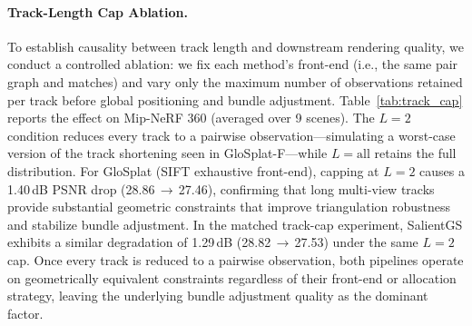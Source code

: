 \documentclass[sigconf]{acmart}
\begin{document}
\begin{table}[h]
\centering
\caption{Track-length distribution on the \texttt{bicycle} scene for GloSplat-A (SIFT exhaustive), GloSplat-F (XFeat+LightGlue, retrieval top-5), and SalientGS (Fisher Vector, $k{=}20$).}
\label{tab:track_dist}
\end{table}

\paragraph{Track-Length Cap Ablation.}
To establish causality between track length and downstream rendering quality, we conduct a controlled ablation: we fix each method's front-end (i.e., the same pair graph and matches) and vary only the maximum number of observations retained per track before global positioning and bundle adjustment. Table~\ref{tab:track_cap} reports the effect on Mip-NeRF 360 (averaged over 9 scenes).
The $L{=}2$ condition reduces every track to a pairwise observation---simulating a worst-case version of the track shortening seen in GloSplat-F---while $L{=}\text{all}$ retains the full distribution.
For GloSplat (SIFT exhaustive front-end), capping at $L{=}2$ causes a 1.40\,dB PSNR drop (28.86\,$\to$\,27.46), confirming that long multi-view tracks provide substantial geometric constraints that improve triangulation robustness and stabilize bundle adjustment.
In the matched track-cap experiment, SalientGS exhibits a similar degradation of 1.29\,dB (28.82\,$\to$\,27.53) under the same $L{=}2$ cap. Once every track is reduced to a pairwise observation, both pipelines operate on geometrically equivalent constraints regardless of their front-end or allocation strategy, leaving the underlying bundle adjustment quality as the dominant factor.
\end{document}
